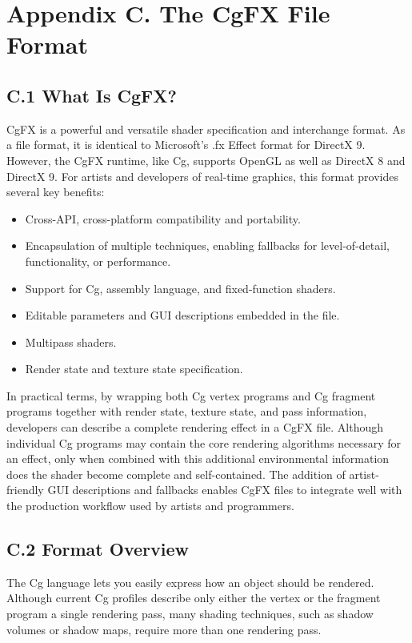 \documentclass[../main.tex]{subfiles}
\begin{document}
\chapter{Appendix C. The CgFX File Format}

\section{C.1 What Is CgFX?}

CgFX is a powerful and versatile shader specification and interchange format. As a file format, it is identical to Microsoft's .fx Effect format for DirectX 9. However, the CgFX runtime, like Cg, supports OpenGL as well as DirectX 8 and DirectX 9. For artists and developers of real-time graphics, this format provides several key benefits:

\begin{itemize}
\item Cross-API, cross-platform compatibility and portability.
\item Encapsulation of multiple techniques, enabling fallbacks for level-of-detail, functionality, or performance.
\item Support for Cg, assembly language, and fixed-function shaders.
\item Editable parameters and GUI descriptions embedded in the file.
\item Multipass shaders.
\item Render state and texture state specification.
\end{itemize}

In practical terms, by wrapping both Cg vertex programs and Cg fragment programs together with render state, texture state, and pass information, developers can describe a complete rendering effect in a CgFX file. Although individual Cg programs may contain the core rendering algorithms necessary for an effect, only when combined with this additional environmental information does the shader become complete and self-contained. The addition of artist-friendly GUI descriptions and fallbacks enables CgFX files to integrate well with the production workflow used by artists and programmers.

\section{C.2 Format Overview}

The Cg language lets you easily express how an object should be rendered. Although current Cg profiles describe only either the vertex or the fragment program a single rendering pass, many shading techniques, such as shadow volumes or shadow maps, require more than one rendering pass.
\end{document}
